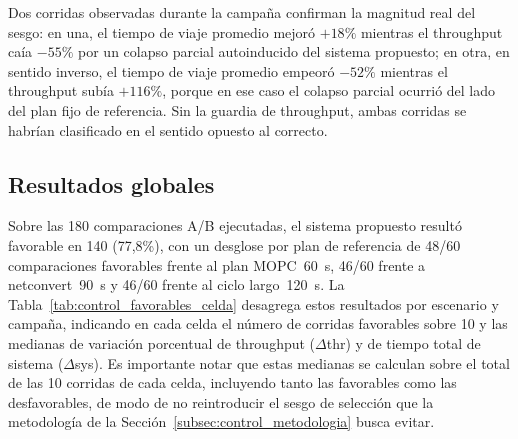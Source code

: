 Dos corridas observadas durante la campaña confirman la magnitud real del sesgo: en una,
el tiempo de viaje promedio mejoró $+18\%$ mientras el throughput caía $-55\%$ por un
colapso parcial autoinducido del sistema propuesto; en otra, en sentido inverso, el
tiempo de viaje promedio empeoró $-52\%$ mientras el throughput subía $+116\%$, porque en
ese caso el colapso parcial ocurrió del lado del plan fijo de referencia. Sin la guardia
de throughput, ambas corridas se habrían clasificado en el sentido opuesto al correcto.

\subsection{Resultados globales}
\label{subsec:control_resultados}

Sobre las 180 comparaciones A/B ejecutadas, el sistema propuesto resultó favorable en 140
(77,8\%), con un desglose por plan de referencia de 48/60 comparaciones favorables frente
al plan MOPC~60~s, 46/60 frente a netconvert~90~s y 46/60 frente al ciclo largo~120~s. La
Tabla~\ref{tab:control_favorables_celda} desagrega estos resultados por escenario y
campaña, indicando en cada celda el número de corridas favorables sobre 10 y las medianas
de variación porcentual de throughput ($\Delta$thr) y de tiempo total de sistema
($\Delta$sys). Es importante notar que estas medianas se calculan sobre el total de las
10 corridas de cada celda, incluyendo tanto las favorables como las desfavorables, de
modo de no reintroducir el sesgo de selección que la metodología de la
Sección~\ref{subsec:control_metodologia} busca evitar.

